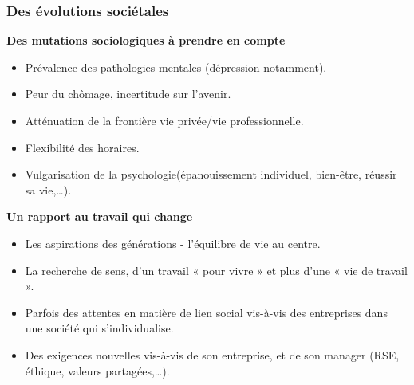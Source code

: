 \documentclass{beamer}
\begin{document}
\begin{frame}
\frametitle{Des évolutions sociétales}
\textbf{Des mutations sociologiques à prendre en compte}  
\begin{itemize}
\item Prévalence des pathologies mentales (dépression notamment).
\item Peur du chômage, incertitude sur l’avenir.
\item Atténuation de la frontière vie privée/vie professionnelle.
\item Flexibilité des horaires.
\item Vulgarisation de la psychologie(épanouissement individuel, bien-être, réussir sa vie,…).
\end{itemize}
\textbf{Un rapport au travail qui change}
\begin{itemize}
\item Les aspirations des générations - l’équilibre de vie au centre.
\item La recherche de sens, d’un travail « pour vivre » et plus d’une « vie de travail ».
\item Parfois des attentes en matière de lien social vis-à-vis des entreprises dans une société qui 
s’individualise.
\item Des exigences nouvelles vis-à-vis de son entreprise, et de son manager (RSE, éthique, valeurs 
partagées,…).
\end{itemize}
\end{frame} 
\end{document}
